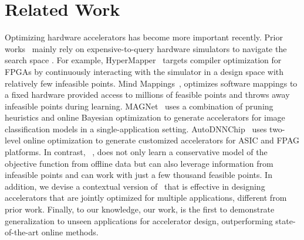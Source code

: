 \vspace{-0.4cm}
\section{Related Work}
\label{sec:prime_related}
\vspace{-0.2cm}
%
Optimizing hardware accelerators has become more important recently. Prior works~\citep{bo:frontiers:2020,flexibo:arxiv:2020,cnn_gen:cyber:2020,prac_dse:mascots:2019,accel_gen:dac:2018,spatial:pldi:2018,automomml:hpc:2016,opentuner:pact:2014,hegdemind,magnet,autodnnchip} mainly rely on expensive-to-query hardware simulators to navigate the search space . For example, HyperMapper~\citep{prac_dse:mascots:2019} targets compiler optimization for FPGAs by continuously interacting with the simulator in a design space with relatively few infeasible points. Mind Mappings~\citep{hegdemind}, optimizes software mappings to a fixed hardware provided access to millions of feasible points and throws away infeasible points during learning. {MAGNet~\citep{magnet} uses a combination of pruning heuristics and online Bayesian optimization to generate accelerators for image classification models in a single-application setting.} {AutoDNNChip~\citep{autodnnchip} uses two-level online optimization to generate customized  accelerators for ASIC and FPAG platforms.} In contrast, \primemethodname~, does not only learn a conservative model of the objective function from offline data but can also leverage information from infeasible points and can work with just a few thousand feasible points. {In addition, we devise a contextual version of \primemethodname\ that is effective in designing accelerators that are jointly optimized for multiple applications, different from prior work.} Finally, to our knowledge, our work, is the first to demonstrate generalization to unseen applications for accelerator design, outperforming state-of-the-art online methods.

